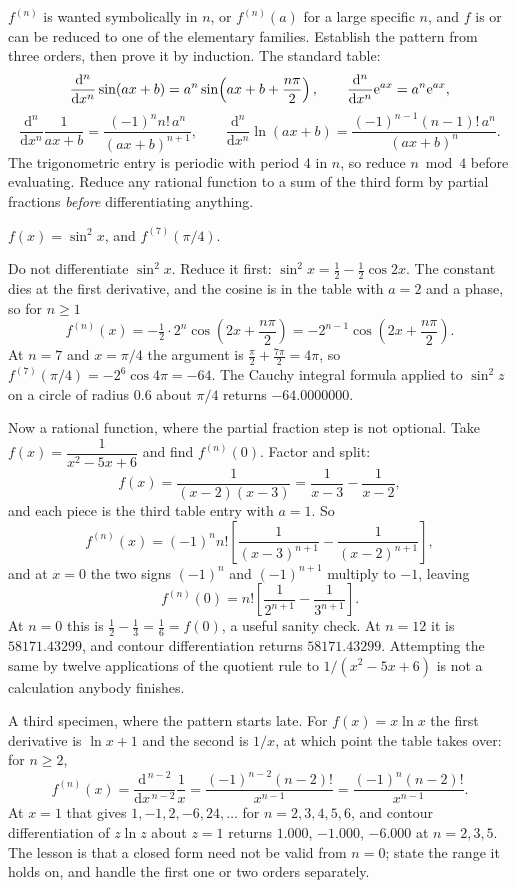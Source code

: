 \cue $f^{(n)}$ is wanted symbolically in $n$, or $f^{(n)}(a)$ for a large specific $n$, and $f$ is or can be reduced to one of the elementary families.
\method Establish the pattern from three orders, then prove it by induction. The standard table:
\[
\frac{\mathrm{d}^{n}}{\mathrm{d}x^{n}}\sin(ax+b)=a^{n}\sin\!\left(ax+b+\frac{n\pi}{2}\right),\qquad
\frac{\mathrm{d}^{n}}{\mathrm{d}x^{n}}\mathrm{e}^{ax}=a^{n}\mathrm{e}^{ax},
\]
\[
\frac{\mathrm{d}^{n}}{\mathrm{d}x^{n}}\frac{1}{ax+b}=\frac{(-1)^{n}n!\,a^{n}}{(ax+b)^{n+1}},\qquad
\frac{\mathrm{d}^{n}}{\mathrm{d}x^{n}}\ln(ax+b)=\frac{(-1)^{n-1}(n-1)!\,a^{n}}{(ax+b)^{n}} .
\]
The trigonometric entry is periodic with period $4$ in $n$, so reduce $n\bmod4$ before evaluating. Reduce any rational function to a sum of the third form by partial fractions \emph{before} differentiating anything.

\begin{worked}
$f(x)=\sin^{2}x$, and $f^{(7)}(\pi/4)$.

Do not differentiate $\sin^{2}x$. Reduce it first: $\sin^{2}x=\tfrac12-\tfrac12\cos2x$. The constant dies at the first derivative, and the cosine is in the table with $a=2$ and a phase, so for $n\geq1$
\[
f^{(n)}(x)=-\tfrac12\cdot2^{n}\cos\!\left(2x+\frac{n\pi}{2}\right)=-2^{n-1}\cos\!\left(2x+\frac{n\pi}{2}\right).
\]
At $n=7$ and $x=\pi/4$ the argument is $\tfrac\pi2+\tfrac{7\pi}{2}=4\pi$, so $f^{(7)}(\pi/4)=-2^{6}\cos4\pi=-64$. The Cauchy integral formula applied to $\sin^{2}z$ on a circle of radius $0.6$ about $\pi/4$ returns $-64.0000000$.

Now a rational function, where the partial fraction step is not optional. Take $f(x)=\dfrac{1}{x^{2}-5x+6}$ and find $f^{(n)}(0)$. Factor and split:
\[
f(x)=\frac{1}{(x-2)(x-3)}=\frac{1}{x-3}-\frac{1}{x-2},
\]
and each piece is the third table entry with $a=1$. So
\[
f^{(n)}(x)=(-1)^{n}n!\left[\frac{1}{(x-3)^{n+1}}-\frac{1}{(x-2)^{n+1}}\right],
\]
and at $x=0$ the two signs $(-1)^{n}$ and $(-1)^{n+1}$ multiply to $-1$, leaving
\[
f^{(n)}(0)=n!\left[\frac{1}{2^{n+1}}-\frac{1}{3^{n+1}}\right].
\]
At $n=0$ this is $\tfrac12-\tfrac13=\tfrac16=f(0)$, a useful sanity check. At $n=12$ it is $58171.43299$, and contour differentiation returns $58171.43299$. Attempting the same by twelve applications of the quotient rule to $1/(x^{2}-5x+6)$ is not a calculation anybody finishes.

A third specimen, where the pattern starts late. For $f(x)=x\ln x$ the first derivative is $\ln x+1$ and the second is $1/x$, at which point the table takes over: for $n\geq2$,
\[
f^{(n)}(x)=\frac{\mathrm{d}^{\,n-2}}{\mathrm{d}x^{\,n-2}}\frac1x=\frac{(-1)^{n-2}(n-2)!}{x^{n-1}}=\frac{(-1)^{n}(n-2)!}{x^{n-1}} .
\]
At $x=1$ that gives $1,-1,2,-6,24,\dots$ for $n=2,3,4,5,6$, and contour differentiation of $z\ln z$ about $z=1$ returns $1.000$, $-1.000$, $-6.000$ at $n=2,3,5$. The lesson is that a closed form need not be valid from $n=0$; state the range it holds on, and handle the first one or two orders separately.
\end{worked}

